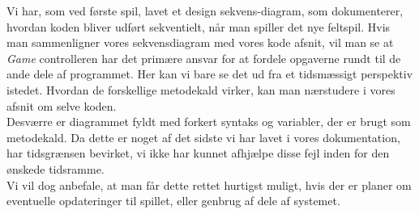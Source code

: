 \newpage
Vi har, som ved første spil,  lavet et design sekvens-diagram, som dokumenterer, hvordan koden bliver udført sekventielt, når man spiller det nye feltspil. Hvis man sammenligner vores sekvensdiagram med vores kode afsnit, vil man se at \textit{Game} controlleren har det primære ansvar for at fordele opgaverne rundt til de ande dele af programmet. Her kan vi bare se det ud fra et tidsmæssigt perspektiv istedet. Hvordan de forskellige metodekald virker, kan man nærstudere i vores afsnit om selve koden.
\\

Desværre er diagrammet fyldt med forkert syntaks og variabler, der er brugt som metodekald. Da dette er noget af det sidste vi har lavet i vores dokumentation, har tidsgrænsen bevirket, vi ikke har kunnet afhjælpe disse fejl inden for den ønskede tidsramme.
\\
Vi vil dog anbefale, at man får dette rettet hurtigst muligt, hvis der er planer om eventuelle opdateringer til spillet, eller genbrug af dele af systemet.